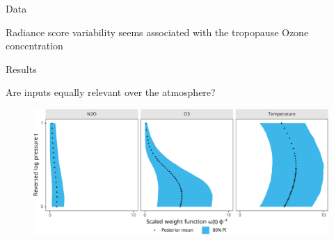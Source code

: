 \documentclass[final]{beamer}
\begin{document}
\begin{frame}[t]
{\begin{minipage}[t][76cm][t]{58cm}
{\begin{minipage}[t][50cm][t]{58cm}
\begin{block}{Data}
            \begin{center}
              Radiance score variability seems associated with the tropopause Ozone
              concentration
            \end{center}
          \end{block}
        \end{minipage}
      }
    \end{minipage}%
  }
  \colorbox{blue!20}{
    \begin{minipage}[t][76cm][t]{58cm}
      Results
      \begin{block}{Are inputs equally relevant over the atmosphere?}
        \begin{figure}
          \centering
          \includegraphics[width=.85\textwidth]{inc/mls_weight_posterior_fsc060}
          \label{fig:mmls-weight-posterior-mini1}
        \end{figure}
      \end{block}


\end{minipage}}
\end{frame}
\end{document}
